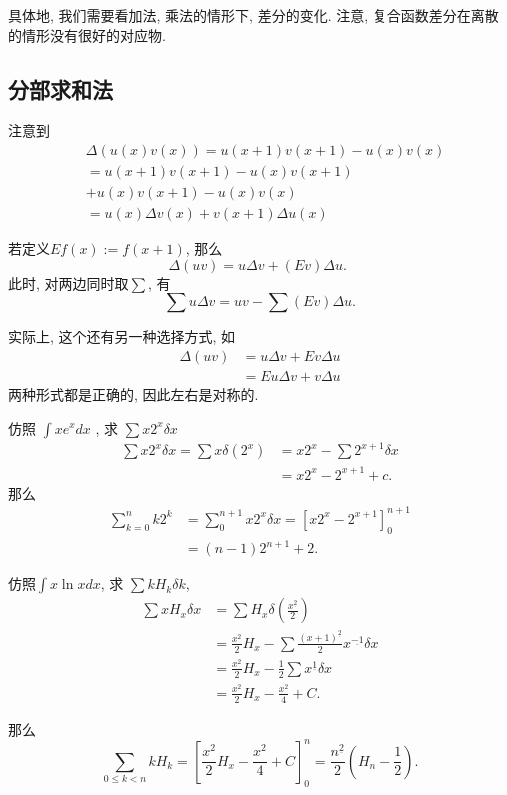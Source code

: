 \documentclass{ctexart}
\begin{document}
具体地, 我们需要看加法, 乘法的情形下, 差分的变化. 注意, 复合函数差分在离散的情形没有很好的对应物.

\subsection{分部求和法}
注意到
$$
	\begin{aligned}
		 & \Delta(u(x) v(x))= u(x+1) v(x+1)-u(x) v(x) \\
		 & = u(x+1) v(x+1)-u(x) v(x+1)                \\
		 & +u(x) v(x+1)-u(x) v(x)                     \\
		 & =u(x) \Delta v(x)+v(x+1) \Delta u(x)
	\end{aligned}
$$

若定义$E f(x):=f(x+1)$, 那么
$$
	\Delta(u v)=u \Delta v+(E v) \Delta u \text {. }
$$
此时, 对两边同时取$\sum$, 有
$$
	\sum u \Delta v=u v-\sum(E v) \Delta u .
$$
\begin{remark}
	实际上, 这个还有另一种选择方式, 如
	$$
		\begin{aligned}
			\Delta(u v) & =u \Delta v+E v \Delta u \\
			            & =E u \Delta v+v \Delta u
		\end{aligned}
	$$
	两种形式都是正确的, 因此左右是对称的.
\end{remark}

\begin{example}仿照 $\int x e^x d x$ ,  求 $\sum x 2^x \delta x$
	$$
		\begin{aligned} \sum x\boxed{2^x} \delta x=\sum x \delta\left(2^x\right) & =x 2^x-\sum 2^{\boxed{x+1}} \delta x \\ & =x 2^x-2^{x+1}+c .\end{aligned}
	$$
	那么
	$$
		\begin{aligned}
			\sum_{k=0}^n k 2^k & =\sum_0^{n+1} x 2^x \delta x=\left[x 2^x-2^{x+1}\right]_0^{n+1} \\
			                   & =(n-1) 2^{n+1}+2 .
		\end{aligned}
	$$
\end{example}

\begin{example}仿照$\int x \ln x d x$, 求 $\sum k H_k \delta k$,
	$$
		\begin{aligned}
			\sum \boxed{x} H_x \delta x & = \sum H_x \delta\left(\frac{x^{\underline{2}}}{2}\right)                                \\
			                            & = \frac{x^2}{2} H_x - \sum \frac{(x+1)^{\underline{2}}}{{2}} x^{\underline{-1}} \delta x \\
			                            & = \frac{x^2}{2} H_x - \frac{1}{2} \sum x^{\underline{1}} \delta x                        \\
			                            & = \frac{x^2}{2} H_x - \frac{x^2}{4} + C.
		\end{aligned}
	$$

	那么
	$$
		\sum_{0 \leqslant k<n} k H_k=\left[\frac{x^2}{2} H_x-\frac{x^2}{4}+C\right]_0^n=\frac{n^{\underline{2}}}{2}\left(H_n-\frac{1}{2}\right) .
	$$

\end{example}
\end{document}
